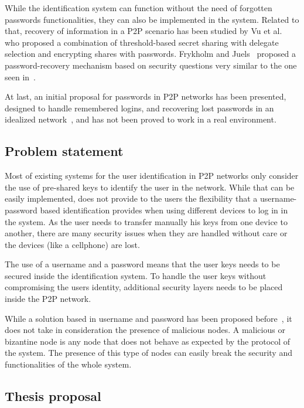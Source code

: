 \documentclass[12pt,spanish]{article}
\begin{document}
While the identification system can function without the need of forgotten
passwords functionalities, they can also be implemented in the system.
Related to that, recovery of information in a P2P scenario has been studied by Vu et al.~\cite{5380695} who proposed
a combination of threshold-based secret sharing with delegate
selection and encrypting shares with passwords.
Frykholm and Juels~\cite{Frykholm:2001:EPR:501983.501985} proposed a password-recovery
mechanism based on security questions very similar to the one seen
in~\cite{kreitz2012passwords}. 

At last, an initial proposal for passwords in P2P networks has been presented,
designed to handle remembered logins, and recovering lost passwords
in an idealized network~\cite{kreitz2012passwords}, and has not been proved to
work in a real environment.

\subsection{Problem statement}

Most of existing systems for the user identification in P2P networks only consider the
use of pre-shared keys to identify the user in the network. While that can
be easily implemented, does not provide to the users the flexibility that a
username-password based identification provides when using different devices to
log in in the system. As the user needs to transfer manually his keys from one
device to another, there are many security issues when they are handled without
care or the devices (like a cellphone) are lost. 

The use of a username and a password means that the user keys needs to be secured inside the identification system.
To handle the user keys without compromising the users identity, additional
security layers needs to be placed inside the P2P network.

While a solution based in username and password has been proposed
before~\cite{kreitz2012passwords}, it does not take in consideration the
presence of malicious nodes. A malicious or bizantine node is any node that does
not behave as expected by the protocol of the system. The presence of this type
of nodes can easily break the security and functionalities of the whole system.


\subsection{Thesis proposal}
\end{document}
